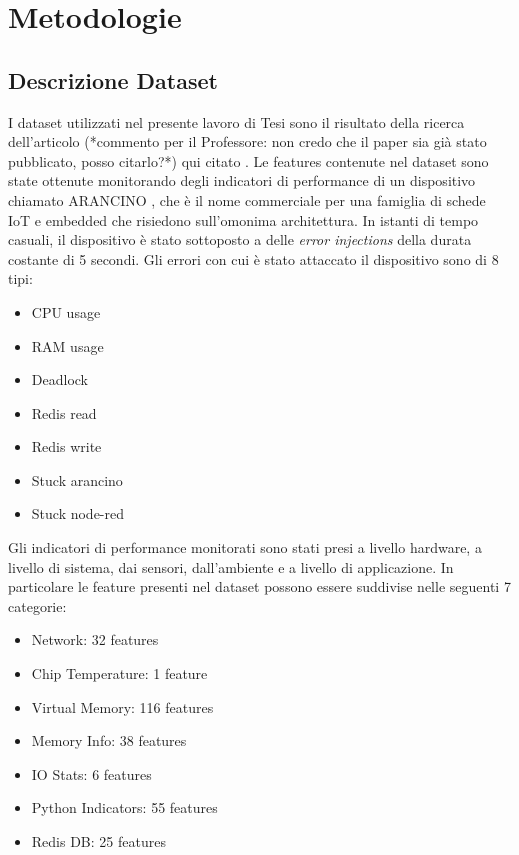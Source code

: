 \chapter{Metodologie}

\medskip

\section{Descrizione Dataset}
I dataset utilizzati nel presente lavoro di Tesi sono il risultato della ricerca dell'articolo (*commento per il Professore: non credo che il paper sia gi\`a stato pubblicato, posso citarlo?*) qui citato \cite{zoppi}. Le features contenute nel dataset sono state ottenute monitorando degli indicatori di performance di un dispositivo chiamato ARANCINO \cite{arancino}, che \`e il nome commerciale per una famiglia di schede IoT e embedded che risiedono sull'omonima architettura. In istanti di tempo casuali, il dispositivo \`e stato sottoposto a delle \textit{error injections} della durata costante di 5 secondi. Gli errori con cui \`e stato attaccato il dispositivo sono di 8 tipi:

\begin{itemize}
    \item CPU usage
    \item RAM usage
    \item Deadlock
    \item Redis read
    \item Redis write
    \item Stuck arancino
    \item Stuck node-red
\end{itemize}


Gli indicatori di performance monitorati sono stati presi a livello hardware, a livello di sistema, dai sensori, dall'ambiente e a livello di applicazione. In particolare le feature presenti nel dataset possono essere suddivise nelle seguenti 7 categorie:

\begin{itemize}
    \item Network: 32 features
    \item Chip Temperature: 1 feature
    \item Virtual Memory: 116 features
    \item Memory Info: 38 features
    \item IO Stats: 6 features
    \item Python Indicators: 55 features
    \item Redis DB: 25 features
\end{itemize}

